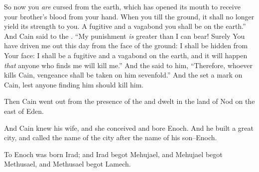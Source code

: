 \bverse So now you \textit{are} cursed from the earth, which has opened its mouth to receive your brother's blood from your hand.
\bverse When you till the ground, it shall no longer yield its strength to you. A fugitive and a vagabond you shall be on the earth.''
\bverse And Cain said to the \lord. ``My punishment \textit{is} greater than I can bear!
\bverse Surely You have driven me out this day from the face of the ground: I shall be hidden from Your face: I shall be a fugitive and a vagabond on the earth, and it will happen \textit{that} anyone who finds me will kill me.''
\bverse And the \lord said to him, ``Therefore, whoever kills Cain, vengeance shall be taken on him sevenfold.'' And the \lord set a mark on Cain, lest anyone finding him should kill him.


\bverse Then Cain went out from the presence of the \lord and dwelt in the land of Nod on the east of Eden.

\bverse And Cain knew his wife, and she conceived and bore Enoch. And he built a great city, and called the name of the city after the name of his son--Enoch.
	
\bverse To Enoch was born Irad; and Irad begot Mehujael, and Mehujael begot Methusael, and Methusael begot Lamech.

\bverse 
\bverse 
\bverse 
\bverse 
\bverse 
\bverse 
\bverse 
\bverse 
